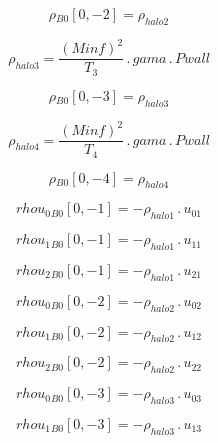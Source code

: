 \documentclass{article}
\begin{document}
\begin{dmath}{\rho{_{B0}}}[{0,-2}] = \rho_{halo 2}\end{dmath}

\begin{dmath}\rho_{halo 3} = \frac{\left(Minf \right)^{2}}{T_{3}} \,.\, gama \,.\, Pwall\end{dmath}

\begin{dmath}{\rho{_{B0}}}[{0,-3}] = \rho_{halo 3}\end{dmath}

\begin{dmath}\rho_{halo 4} = \frac{\left(Minf \right)^{2}}{T_{4}} \,.\, gama \,.\, Pwall\end{dmath}

\begin{dmath}{\rho{_{B0}}}[{0,-4}] = \rho_{halo 4}\end{dmath}

\begin{dmath}{rhou_{0}{_{B0}}}[{0,-1}] = - \rho_{halo 1} \,.\, u_{01}\end{dmath}

\begin{dmath}{rhou_{1}{_{B0}}}[{0,-1}] = - \rho_{halo 1} \,.\, u_{11}\end{dmath}

\begin{dmath}{rhou_{2}{_{B0}}}[{0,-1}] = - \rho_{halo 1} \,.\, u_{21}\end{dmath}

\begin{dmath}{rhou_{0}{_{B0}}}[{0,-2}] = - \rho_{halo 2} \,.\, u_{02}\end{dmath}

\begin{dmath}{rhou_{1}{_{B0}}}[{0,-2}] = - \rho_{halo 2} \,.\, u_{12}\end{dmath}

\begin{dmath}{rhou_{2}{_{B0}}}[{0,-2}] = - \rho_{halo 2} \,.\, u_{22}\end{dmath}

\begin{dmath}{rhou_{0}{_{B0}}}[{0,-3}] = - \rho_{halo 3} \,.\, u_{03}\end{dmath}

\begin{dmath}{rhou_{1}{_{B0}}}[{0,-3}] = - \rho_{halo 3} \,.\, u_{13}\end{dmath}
\end{document}
